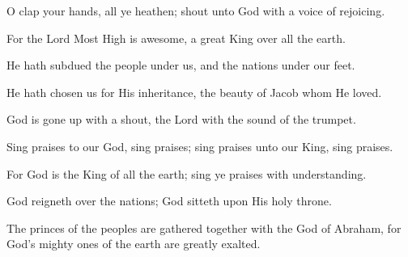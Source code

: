 O clap your hands, all ye heathen; shout unto God with a voice of rejoicing.

For the Lord Most High is awesome, a great King over all the earth.

He hath subdued the people under us, and the nations under our feet.

He hath chosen us for His inheritance, the beauty of Jacob whom He loved.

God is gone up with a shout, the Lord with the sound of the trumpet.

Sing praises to our God, sing praises; sing praises unto our King, sing praises.

For God is the King of all the earth; sing ye praises with understanding.

God reigneth over the nations; God sitteth upon His holy throne.

The princes of the peoples are gathered together with the God of Abraham, for God's mighty ones of the earth are greatly exalted.

